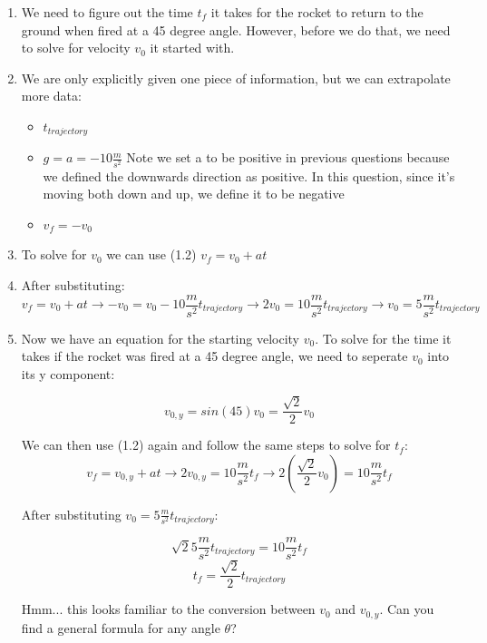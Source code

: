 \begin{solution}
\begin{enumerate}
    \item We need to figure out the time $t_f$ it takes for the rocket to return to the ground when fired at a 45 degree angle. However, before we do that, we need to solve for velocity $v_0$ it started with.
    \item We are only explicitly given one piece of information, but we can extrapolate more data:
    \begin{itemize}
        \item $t_{trajectory}$
        \item $g = a = -10\frac{m}{s^2}$ Note we set a to be positive in previous questions because we defined the downwards direction as positive. In this question, since it's moving both down and up, we define it to be negative
        \item $v_f = -v_0$
    \end{itemize}
    \item To solve for $v_0$ we can use (1.2) $v_f=v_0+at$
    \item After substituting:
    \begin{equation*}
        v_f=v_0+at \rightarrow
        -v_0=v_0-10\frac{m}{s^2}t_{trajectory} \rightarrow
        2v_0=10\frac{m}{s^2}t_{trajectory} \rightarrow
        v_0=5\frac{m}{s^2}t_{trajectory}
    \end{equation*}
    \item Now we have an equation for the starting velocity $v_0$. To solve for the time it takes if the rocket was fired at a 45 degree angle, we need to seperate $v_0$ into its y component:
    
    \begin{equation*}
        v_{0,y} = sin(45)v_0 = \frac{\sqrt{2}}{2}v_0
    \end{equation*}
    
    We can then use (1.2) again and follow the same steps to solve for $t_f$:
    \begin{equation*}
        v_f=v_{0,y}+at \rightarrow
        2v_{0,y}=10\frac{m}{s^2}t_f \rightarrow
        2(\frac{\sqrt{2}}{2}v_0)=10\frac{m}{s^2}t_f
    \end{equation*}
    
    After substituting $v_0=5\frac{m}{s^2}t_{trajectory}$:
    
    \begin{equation*}
        \sqrt{2}5\frac{m}{s^2}t_{trajectory} = 10\frac{m}{s^2}t_f
    \end{equation*}
    \begin{equation*}
        t_f=\frac{\sqrt{2}}{2}t_{trajectory}
    \end{equation*}
    
    Hmm... this looks familiar to the conversion between $v_0$ and $v_{0,y}$. Can you find a general formula for any angle $\theta$?
\end{enumerate}
\end{solution}

